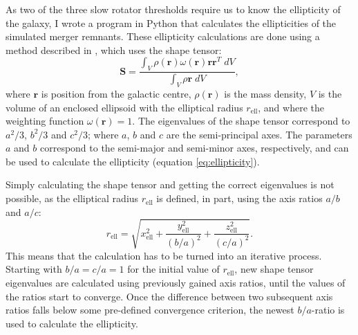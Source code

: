 \documentclass[english, twoside]{HYgradu}
\begin{document}
As two of the three slow rotator thresholds require us to know the ellipticity of the galaxy, I wrote a program in Python that calculates the ellipticities of the simulated merger remnants. These ellipticity calculations are done using a method described in \cite{Zemp2011}, which uses the shape tensor:
\begin{equation}
\mathbf{S} = \frac{\int_V \rho(\mathbf{r}) \omega(\mathbf{r}) \mathbf{r} \mathbf{r}^T \; dV }{\int_V \rho{\mathbf{r}} \; dV},
\end{equation}
where $\mathbf{r}$ is position from the galactic centre, $\rho(\mathbf{r})$ is the mass density, $V$ is the volume of an enclosed ellipsoid with the elliptical radius $r_\mathrm{ell}$, and where the weighting function $\omega(\mathbf{r}) = 1$. The eigenvalues of the shape tensor correspond to $a^2/3$, $b^2/3$ and $c^2/3$; where $a$, $b$ and $c$ are the semi-principal axes. The parameters $a$ and $b$ correspond to the semi-major and semi-minor axes, respectively, and can be used to calculate the ellipticity (equation \ref{eq:ellipticity}). 

Simply calculating the shape tensor and getting the correct eigenvalues is not possible, as the elliptical radius $r_\mathrm{ell}$ is defined, in part, using the axis ratios $a/b$ and $a/c$:
\begin{equation}
r_\mathrm{ell} = \sqrt{x_\mathrm{ell}^2 + \frac{y_\mathrm{ell}^2}{(b/a)^2} + \frac{z_\mathrm{ell}^2}{(c/a)^2}}.
\end{equation}
This means that the calculation has to be turned into an iterative process. Starting with $b/a = c/a = 1$ for the initial value of $r_\mathrm{ell}$, new shape tensor eigenvalues are calculated using previously gained axis ratios, until the values of the ratios start to converge. Once the difference between two subsequent axis ratios falls below some pre-defined convergence criterion, the newest $b/a$-ratio is used to calculate the ellipticity.
\end{document}
